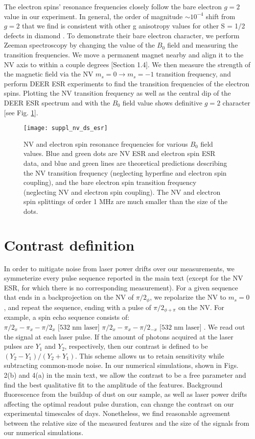 \documentclass[%
 reprint,
 amsmath,amssymb,
 aps,
]{revtex4-1}
\begin{document}
The electron spins' resonance frequencies closely follow the bare electron $g=2$ value in our experiment. In general, the order of magnitude $\sim 10^{-4}$ shift from $g = 2$ that we find is consistent with other g anisotropy values for other S = 1/2 defects in diamond \cite{newton paper 1,newton paper 2,baker paper}. To demonstrate their bare electron character, we perform Zeeman spectroscopy by changing the value of the $B_0$ field and measuring the transition frequencies. We move a permanent magnet nearby and align it to the NV axis to within a couple degrees [Section 1.4]. We then measure the strength of the magnetic field via the NV $m_s = 0 \rightarrow m_s = -1$ transition frequency, and perform DEER ESR experiments to find the transition frequencies of the electron spins. Plotting the NV transition frequency as well as the central dip of the DEER ESR spectrum and with the $B_0$ field value shows definitive $g=2$ character [see Fig. \ref{fig:figS3}]. 
\begin{figure}[h!]
\centering
\texttt{[image: suppl\_nv\_ds\_esr]}
\caption{\label{fig:figS3} NV and electron spin resonance frequencies for various $B_0$ field values. Blue and green dots are NV ESR and electron spin ESR data, and blue and green lines are theoretical predictions describing the NV transition frequency (neglecting hyperfine and electron spin coupling), and the bare electron spin transition frequency (neglecting NV and electron spin coupling). The NV and electron spin splittings of order 1 MHz are much smaller than the size of the dots.}
\end{figure}

\section{Contrast definition}
In order to mitigate noise from laser power drifts over our measurements, we symmeterize every pulse sequence reported in the main text (except for the NV ESR, for which there is no corresponding measurement). For a given sequence that ends in a backprojection on the NV of $\pi/2_{\phi}$, we repolarize the NV to $m_s = 0$, and repeat the sequence, ending with a pulse of $\pi/2_{\phi + \pi}$ on the NV. For example, a spin echo sequence consists of: $\pi/2_{x} - \pi_{x} - \pi/2_{x} \text{ [532 nm laser] } \pi/2_{x} - \pi_{x} - \pi/2_{-x} \text{ [532 nm laser] }$. We read out the signal at each laser pulse. If the amount of photons acquired at the laser pulses are $Y_1$ and $Y_2$, respectively, then our contrast is defined to be $(Y_2 - Y_1)/(Y_2 + Y_1)$. This scheme allows us to retain sensitivity while subtracting common-mode noise. In our numerical simulations, shown in Figs. 2(b) and 4(a) in the main text, we allow the contrast to be a free parameter and find the best qualitative fit to the amplitude of the features. Background fluorescence from the buildup of dust on our sample, as well as laser power drifts affecting the optimal readout pulse duration, can change the contrast on our experimental timescales of days. Nonetheless, we find reasonable agreement between the relative size of the measured features and the size of the signals from our numerical simulations.
\end{document}
